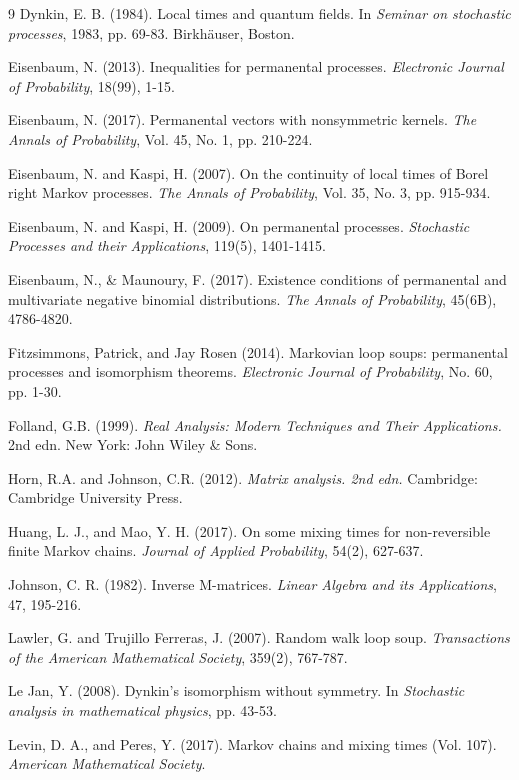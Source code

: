 \documentclass[a4paper, 11pt]{article}
\begin{document}
\begin{thebibliography}{9}
  Dynkin, E. B. (1984). Local times and quantum fields. In {\em Seminar on stochastic processes}, 1983, pp. 69-83. Birkhäuser, Boston.

  Eisenbaum, N. (2013). Inequalities for permanental processes. {\em Electronic Journal of Probability}, 18(99), 1-15.

  Eisenbaum, N. (2017). Permanental vectors with nonsymmetric kernels. {\em The Annals of Probability}, Vol. 45, No. 1, pp. 210-224.

  Eisenbaum, N. and Kaspi, H. (2007). On the continuity of local times of Borel right Markov processes. {\em The Annals of Probability}, Vol. 35, No. 3, pp. 915-934.

  Eisenbaum, N. and Kaspi, H. (2009). On permanental processes. {\em Stochastic Processes and their Applications}, 119(5), 1401-1415.

  Eisenbaum, N., \& Maunoury, F. (2017). Existence conditions of permanental and multivariate negative binomial distributions. {\em The Annals of Probability}, 45(6B), 4786-4820.

  Fitzsimmons, Patrick, and Jay Rosen (2014). Markovian loop soups: permanental processes and isomorphism theorems.
  {\em Electronic Journal of Probability}, No. 60, pp. 1-30.

  Folland, G.B. (1999).
  {\em Real Analysis: Modern Techniques and Their Applications.}
  2nd edn. New York: John Wiley \& Sons.

  Horn, R.A. and Johnson, C.R. (2012).
  {\em Matrix analysis. 2nd edn.}
  Cambridge: Cambridge University Press.

  Huang, L. J., and Mao, Y. H. (2017). On some mixing times for non-reversible finite Markov chains. {\em Journal of Applied Probability}, 54(2), 627-637.

  Johnson, C. R. (1982). Inverse M-matrices. {\em Linear Algebra and its Applications}, 47, 195-216.

  Lawler, G. and Trujillo Ferreras, J. (2007). Random walk loop soup. {\em Transactions of the American Mathematical Society}, 359(2), 767-787.

  Le Jan, Y. (2008). Dynkin’s isomorphism without symmetry. In {\em Stochastic analysis in mathematical physics}, pp. 43-53.

  Levin, D. A., and Peres, Y. (2017). Markov chains and mixing times (Vol. 107). {\em American Mathematical Society}.


\end{thebibliography}
\end{document}
